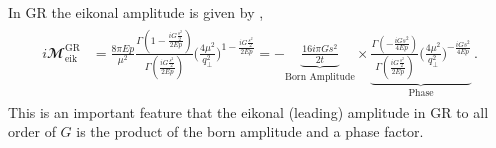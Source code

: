 In GR the eikonal amplitude is given by \cite{Amati:1987uf, Kabat:1992tb},
\begin{align}
\begin{split}
    i\mathbfcal{M}^{\textrm{GR}}_{\textrm{eik}}&=\frac{8\pi E p}{\mu^2} \frac{\Gamma\left(1-\frac{i G\frac{s^2}{2}}{2Ep}\right)}{\Gamma\left(\frac{i G\frac{s^2}{2}}{2Ep}\right)}\Bigg(\frac{4\mu^2}{q_{\perp}^2}\Bigg)^{1-\frac{i G\frac{s^2}{2}}{2Ep}}
    =-\underbrace{\frac{16 i \pi  G s^2}{2t}}_{\text{Born Amplitude}}\times\underbrace{\frac{\Gamma\left(-\frac{i G{s^2}}{4Ep}\right)}{\Gamma\left(\frac{i G\frac{s^2}{2}}{2Ep}\right)}\Bigg(\frac{4\mu^2}{q_{\perp}^2}\Bigg)^{-\frac{i G{s^2}}{4Ep}}}_{\text{Phase}}\,.
    \end{split}
\end{align}
This is an important feature that the eikonal (leading) amplitude in GR to all order of $G$ is the product of the born amplitude and a phase factor. 
